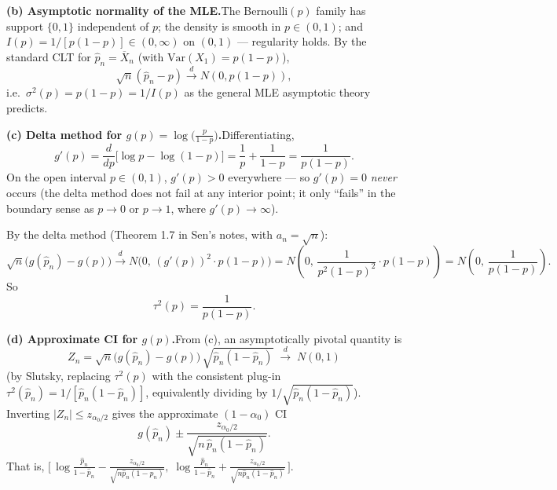 \documentclass[11pt]{article}
\newcommand{\Var}{\mathrm{Var}}
\begin{document}
\textbf{(b) Asymptotic normality of the MLE.}\quad The Bernoulli$(p)$ family has support $\{0,1\}$ independent of $p$; the density is smooth in $p \in (0,1)$; and $I(p) = 1/[p(1-p)] \in (0,\infty)$ on $(0,1)$ --- regularity holds. By the standard CLT for $\hat p_n = \overline{X}_n$ (with $\Var(X_1) = p(1-p)$),
\[
\sqrt{n}(\hat p_n - p) \xrightarrow{d} N(0, p(1-p)),
\]
i.e.\ $\sigma^2(p) = p(1-p) = 1/I(p)$ as the general MLE asymptotic theory predicts.

\medskip

\textbf{(c) Delta method for $g(p) = \log\!\bigl(\tfrac{p}{1-p}\bigr)$.}\quad Differentiating,
\[
g'(p) = \frac{d}{dp}\bigl[\log p - \log(1-p)\bigr] = \frac{1}{p} + \frac{1}{1-p} = \frac{1}{p(1-p)}.
\]
On the open interval $p \in (0,1)$, $g'(p) > 0$ everywhere --- so $g'(p) = 0$ \emph{never} occurs (the delta method does not fail at any interior point; it only ``fails'' in the boundary sense as $p \to 0$ or $p\to 1$, where $g'(p)\to\infty$).

By the delta method (Theorem 1.7 in Sen's notes, with $a_n = \sqrt{n}$):
\[
\sqrt{n}\bigl(g(\hat p_n) - g(p)\bigr) \xrightarrow{d} N\!\bigl(0,\,(g'(p))^2 \cdot p(1-p)\bigr) = N\!\left(0,\,\frac{1}{p^2(1-p)^2}\cdot p(1-p)\right) = N\!\left(0,\,\frac{1}{p(1-p)}\right).
\]
So
\[
\boxed{\;\tau^2(p) = \frac{1}{p(1-p)}.\;}
\]

\medskip

\textbf{(d) Approximate CI for $g(p)$.}\quad From (c), an asymptotically pivotal quantity is
\[
Z_n = \sqrt{n}\bigl(g(\hat p_n) - g(p)\bigr)\,\sqrt{\hat p_n(1-\hat p_n)} \;\xrightarrow{d}\; N(0,1)
\]
(by Slutsky, replacing $\tau^2(p)$ with the consistent plug-in $\tau^2(\hat p_n) = 1/[\hat p_n(1-\hat p_n)]$, equivalently dividing by $1/\sqrt{\hat p_n(1-\hat p_n)}$). Inverting $|Z_n|\le z_{\alpha_0/2}$ gives the approximate $(1-\alpha_0)$ CI
\[
\boxed{\;g(\hat p_n) \pm \frac{z_{\alpha_0/2}}{\sqrt{n\,\hat p_n(1-\hat p_n)}}.\;}
\]
That is, $\bigl[\,\log\!\tfrac{\hat p_n}{1-\hat p_n} - \tfrac{z_{\alpha_0/2}}{\sqrt{n\hat p_n(1-\hat p_n)}},\;\log\!\tfrac{\hat p_n}{1-\hat p_n} + \tfrac{z_{\alpha_0/2}}{\sqrt{n\hat p_n(1-\hat p_n)}}\,\bigr]$.

\medskip
\end{document}
